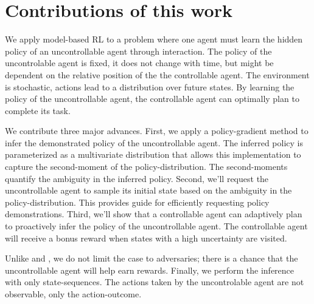 \section{Contributions of this work}\label{sec:contributions}

    We apply model-based \ac{RL} to a problem where one agent must learn the hidden policy of an uncontrollable agent
    through interaction. The policy of the uncontrolable agent is fixed, it does not change with time, but might be
    dependent on the relative position of the the controllable agent. The environment is stochastic, actions lead to a
    distribution over future states. By learning the policy of the uncontrollable agent, the controllable agent can
    optimally plan to complete its task.

    We contribute three major advances. First, we apply a policy-gradient method to infer the demonstrated policy of the
    uncontrollable agent. The inferred policy is parameterized as a multivariate distribution that allows this
    implementation to capture the second-moment of the policy-distribution. The second-moments quantify the ambiguity in
    the inferred policy. Second,  we'll request the uncontrollable agent to sample its initial state based on the
    ambiguity in the policy-distribution. This provides guide for efficiently requesting policy demonstrations. Third,
    we'll show that a controllable agent can adaptively plan to proactively infer the policy  of the uncontrollable
    agent. The controllable agent will receive a bonus reward when states with a high uncertainty are visited.

    Unlike \cite{lim2013reinforcement} and \cite{bertuccelli2012robust}, we do not limit the case to adversaries; there
    is a chance that the uncontrollable agent will help earn rewards. Finally, we perform the inference with only
    state-sequences. The actions taken by the uncontrolable agent are not observable, only the action-outcome.

